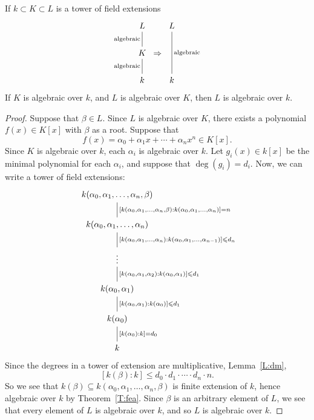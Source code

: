 \documentclass{ximera}
\begin{document}
\begin{corollary}\label{C:feac}
  If $k\subset K\subset L$ is a tower of field extensions
  \[
  \begin{tikzcd}[column sep=0pt]
    L\ar[d,-,"\text{algebraic}",swap] & & L\ar[dd,-,"\text{algebraic}"]\\
    K \ar[d,-,"\text{algebraic}",swap] & \Rightarrow& \\
    k & \vphantom{K} & k
  \end{tikzcd}
  \]
  If $K$ is algebraic over $k$, and $L$ is algebraic over $K$, then $L$
  is algebraic over $k$.
  \begin{proof}
    Suppose that $\beta\in L$. Since $L$ is algebraic over $K$, there
    exists a polynomial $f(x)\in K[x]$ with $\beta$ as a root. Suppose that
    \[
    f(x) = \alpha_0 + \alpha_1 x + \cdots + \alpha_n x^n \in K[x].
    \]
    Since $K$ is algebraic over $k$, each $\alpha_i$ is algebraic over
    $k$. Let $g_i(x)\in k[x]$ be the minimal polynomial for each
    $\alpha_i$, and suppose that $\deg(g_i) = d_i$. Now, we can write
    a tower of field extensions:
    \[
    \begin{tikzcd}
      k(\alpha_0,\alpha_1,\dots,\alpha_n,\beta) \ar[d,-, "{[k(\alpha_0,\alpha_1,\dots, \alpha_n,\beta):k(\alpha_0,\alpha_1,\dots, \alpha_n)] = n}"]\\
      k(\alpha_0,\alpha_1,\dots,\alpha_n) \ar[d,-, "{[k(\alpha_0,\alpha_1,\dots, \alpha_n):k(\alpha_0,\alpha_1,\dots, \alpha_{n-1})] \le d_n}"]\\
      \vdots  \ar[d,-,"{[k(\alpha_0,\alpha_1,\alpha_2):k(\alpha_0,\alpha_1)] \le d_1}"]\\
      k(\alpha_0,\alpha_1) \ar[d,-, "{[k(\alpha_0,\alpha_1):k(\alpha_0)] \le d_1}"]\\
      k(\alpha_0) \ar[d,-, "{[k(\alpha_0):k] =d_0}"]\\
      k
    \end{tikzcd}
    \]
    Since the degrees in a tower of extension are multiplicative,
    Lemma~\ref{L:dm},
    \[
    [k(\beta):k]\le d_0\cdot d_1 \cdot \cdots \cdot d_n \cdot n.
    \]
    So we see that $k(\beta)\subseteq
    k(\alpha_0,\alpha_1,\dots,\alpha_n,\beta)$ is finite extension of
    $k$, hence algebraic over $k$ by Theorem~\ref{T:fea}. Since $\beta$
    is an arbitrary element of $L$, we see that every element of $L$
    is algebraic over $k$, and so $L$ is algebraic over $k$.
  \end{proof}
\end{corollary}
\end{document}
